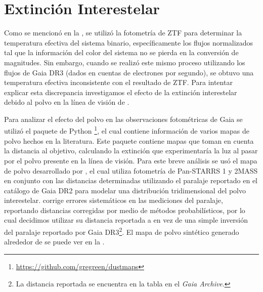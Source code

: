 
\section{Extinción Interestelar}

Como se mencionó en la
, se
utilizó la fotometría de ZTF para determinar la temperatura efectiva del sistema
binario, específicamente los flujos normalizados tal que la información del
color del sistema no se pierda en la conversión de magnitudes. Sin embargo,
cuando se realizó este mismo proceso utilizando los flujos de Gaia DR3 (dados en
cuentas de electrones por segundo), se obtuvo una temperatura efectiva
inconsistente con el resultado de ZTF. Para intentar explicar esta discrepancia
investigamos el efecto de la extinción interestelar debido al polvo en la línea
de visión de \atoObjIdNoSpace.

Para analizar el efecto del polvo en las observaciones fotométricas de Gaia se
utilizó el paquete de Python
\footnote{\url{https://github.com/gregreen/dustmaps}}, el cual
contiene información de varios mapas de polvo hechos en la literatura. Este
paquete contiene mapas que toman en cuenta la distancia al objetivo, calculando
la extinción que experimentaría la luz al pasar por el polvo presente en la
línea de visión. Para este breve análisis se usó el mapa de polvo desarrollado
por , el cual utiliza
fotometría de Pan-STARRS 1 y 2MASS en conjunto con las distancias determinadas
utilizando el paralaje reportado en el catálogo de Gaia DR2 para modelar una
distribución tridimensional del polvo interestelar.
 corrige errores
sistemáticos en las mediciones del paralaje, reportando distancias corregidas
por medio de métodos probabilísticos, por lo cual decidimos utilizar su
distancia reportada a \atoObjId en vez de una simple inversión del paralaje
reportado por Gaia DR3\footnote{La distancia reportada se encuentra en la tabla
 en el \textit{Gaia Archive}.}. El mapa de polvo
sintético generado alrededor de \atoObjId se puede ver en la
.

